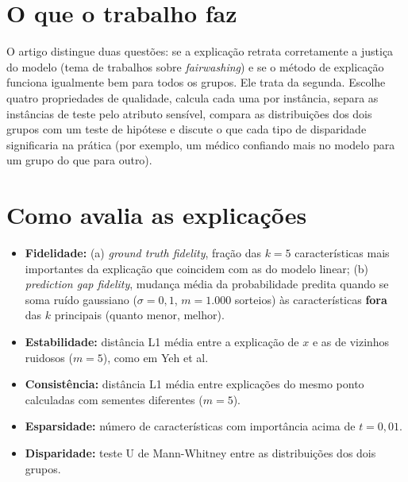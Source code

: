 \documentclass[11pt,a4paper]{article}
\begin{document}
\section{O que o trabalho faz}
O artigo distingue duas questões: se a explicação retrata corretamente a justiça do modelo (tema de trabalhos sobre \textit{fairwashing}) e se o método de explicação funciona igualmente bem para todos os grupos. Ele trata da segunda. Escolhe quatro propriedades de qualidade, calcula cada uma por instância, separa as instâncias de teste pelo atributo sensível, compara as distribuições dos dois grupos com um teste de hipótese e discute o que cada tipo de disparidade significaria na prática (por exemplo, um médico confiando mais no modelo para um grupo do que para outro).

\section{Como avalia as explicações}
\begin{itemize}
  \item \textbf{Fidelidade:} (a) \textit{ground truth fidelity}, fração das $k = 5$ características mais importantes da explicação que coincidem com as do modelo linear; (b) \textit{prediction gap fidelity}, mudança média da probabilidade predita quando se soma ruído gaussiano ($\sigma = 0{,}1$, $m = 1.000$ sorteios) às características \textbf{fora} das $k$ principais (quanto menor, melhor).
  \item \textbf{Estabilidade:} distância L1 média entre a explicação de $x$ e as de vizinhos ruidosos ($m = 5$), como em Yeh et al.
  \item \textbf{Consistência:} distância L1 média entre explicações do mesmo ponto calculadas com sementes diferentes ($m = 5$).
  \item \textbf{Esparsidade:} número de características com importância acima de $t = 0{,}01$.
  \item \textbf{Disparidade:} teste U de Mann-Whitney entre as distribuições dos dois grupos.
\end{itemize}
\end{document}
